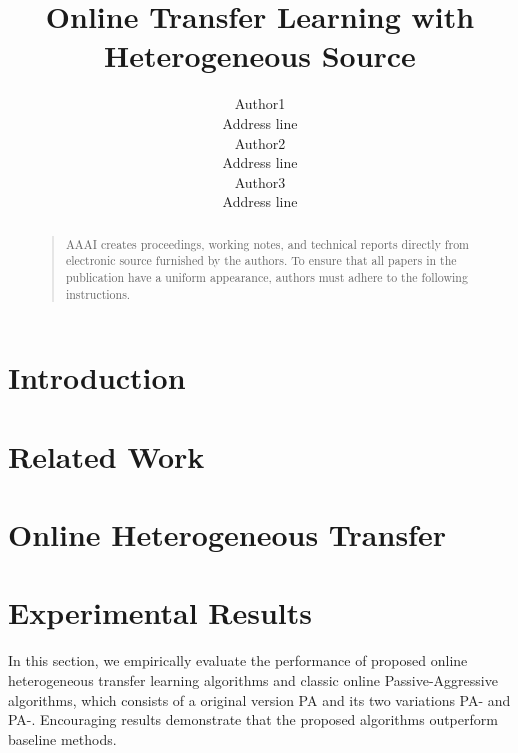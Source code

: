 \documentclass[letterpaper]{article}
\begin{document}
%
\title{Online Transfer Learning with Heterogeneous Source}
\author{Author1\\ Address line\\
\And Author2 \\ Address line\\
\And Author3 \\ Address line\\
}
\maketitle
\begin{abstract}
\begin{quote}
AAAI creates proceedings, working notes, and technical reports directly from electronic source furnished by the authors. To ensure that all papers in the publication have a uniform appearance, authors must adhere to the following instructions. 
\end{quote}
\end{abstract}


\section{Introduction}

\section{Related Work}

\section{Online Heterogeneous Transfer}

\section{Experimental Results}

In this section, we empirically evaluate the performance of proposed online heterogeneous transfer learning algorithms and classic online Passive-Aggressive algorithms, which consists of a original version PA and its two variations PA-\uppercase\expandafter{} and PA-\uppercase\expandafter{}.
Encouraging results demonstrate that the proposed algorithms outperform baseline methods.

\end{document}
